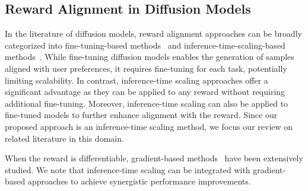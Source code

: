 \subsection{Reward Alignment in Diffusion Models}
\vspace{-0.5\baselineskip}
In the literature of diffusion models, reward alignment approaches can be broadly categorized into fine-tuning-based methods~\cite{Black2024:DDPO, Yang2024:D3PO, Wallace:2024DiffusionDPO, Clark2024:DRaFT, Prabhudesai2023:AlignProp, Xu2023:ImageReward} and inference-time-scaling-based methods~\cite{Li2024:SVDD, Singh:2025CoDE, Dou2024:FPS, Wu:2023TDS, Cardoso2024:MCGDiff}. 
While fine-tuning diffusion models enables the generation of samples aligned with user preferences, it requires fine-tuning for each task, potentially limiting scalability. In contrast, inference-time scaling approaches offer a significant advantage as they can be applied to any reward without requiring additional fine-tuning. 
Moreover, inference-time scaling can also be applied to fine-tuned models to further enhance alignment with the reward. 
Since our proposed approach is an inference-time scaling method, we focus our review on related literature in this domain. 

When the reward is differentiable, gradient-based methods~\cite{Chung:2023DPS, Bansal:2023UGD, Yu:2023FreeDOM, Eyring2024:ReNO, Guo:2024InitNO, Wallace:2023DOODL, Benhamu:2024DFlow} have been extensively studied. 
We note that inference-time scaling can be integrated with gradient-based approaches to achieve synergistic performance improvements. 

\vspace{-0.55\baselineskip}
